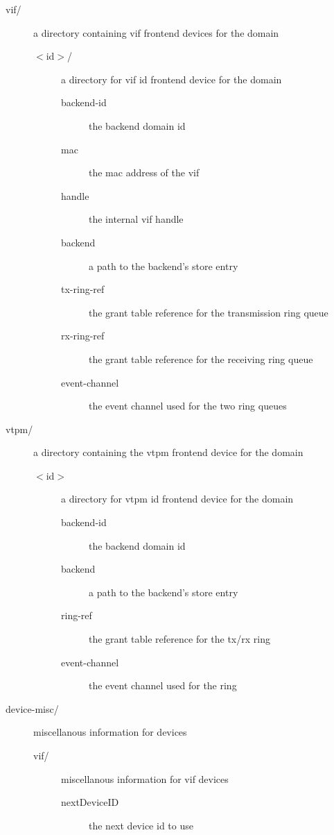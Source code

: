 \documentclass[11pt,twoside,final,openright]{report}
\begin{document}
\begin{description}
\begin{description}
\begin{description}
      \item[vif/] a directory containing vif frontend devices for the
	domain
	\begin{description}
	\item[$<$id$>$/] a directory for vif id frontend device for the domain
	  \begin{description}
	  \item[backend-id] the backend domain id
	  \item[mac] the mac address of the vif
	  \item[handle] the internal vif handle
	  \item[backend] a path to the backend's store entry
	  \item[tx-ring-ref] the grant table reference for the transmission ring queue 
	  \item[rx-ring-ref] the grant table reference for the receiving ring queue 
	  \item[event-channel] the event channel used for the two ring queues 
	  \end{description}
	\end{description}

      \item[vtpm/] a directory containing the vtpm frontend device for the
        domain
        \begin{description}
        \item[$<$id$>$] a directory for vtpm id frontend device for the domain
          \begin{description}
	  \item[backend-id] the backend domain id
          \item[backend] a path to the backend's store entry
          \item[ring-ref] the grant table reference for the tx/rx ring
          \item[event-channel] the event channel used for the ring
          \end{description}
        \end{description}
	
      \item[device-misc/] miscellanous information for devices 
	\begin{description}
	\item[vif/] miscellanous information for vif devices
	  \begin{description}
	  \item[nextDeviceID] the next device id to use 
	  \end{description}
	\end{description}
      \end{description}
    \end{description}


\end{description}
\end{document}
